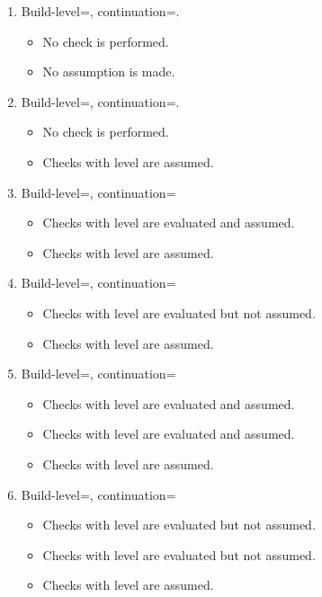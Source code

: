\begin{enumerate}

\item Build-level=, continuation=.
\begin{itemize}
  \item No check is performed.
  \item No assumption is made.
\end{itemize}

\item Build-level=, continuation=.
\begin{itemize}
  \item No check is performed.
  \item Checks with  level are assumed.
\end{itemize}

\item Build-level=, continuation=
\begin{itemize}
  \item Checks with  level are evaluated and assumed.
  \item Checks with  level are assumed.
\end{itemize}

\item Build-level=, continuation=
\begin{itemize}
  \item Checks with  level are evaluated but not assumed.
  \item Checks with  level are assumed.
\end{itemize}

\item Build-level=, continuation=
\begin{itemize}
  \item Checks with  level are evaluated and assumed.
  \item Checks with  level are evaluated and assumed.
  \item Checks with  level are assumed.
\end{itemize}

\item Build-level=, continuation=
\begin{itemize}
  \item Checks with  level are evaluated but not assumed.
  \item Checks with  level are evaluated but not assumed.
  \item Checks with  level are assumed.
\end{itemize}
\end{enumerate}
